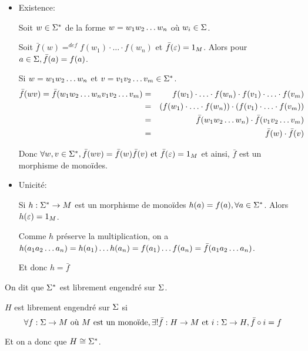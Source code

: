 \begin{proofI}
	\begin{itemize}
		\item Existence:

		      Soit $w\in \Sigma^{*}$ de la forme $w = w_1 w_2 \ldots w_{n}$ où $w_i \in \Sigma$.

		      Soit $\bar f (w) =^{def} f(w_1) \cdot \ldots \cdot f(w_n)$ et $\bar f (\varepsilon) = 1_M$. Alors pour $a\in \Sigma, \bar f (a) = f (a)$.

		      Si $w = w_1 w_2 \ldots w_{n}$ et $v = v_1 v_2 \ldots v_{m} \in \Sigma^{*}$.
		      \begin{eqnarray*}
			      \bar f(wv) = \bar f(w_1 w_2 \ldots w_{n} v_1 v_2 \ldots v_{m}) &=& f(w_1) \cdot \ldots \cdot f(w_n) \cdot f(v_1) \cdot \ldots \cdot f(v_m) \\
			      &=& \left( f(w_1) \cdot \ldots \cdot f(w_n)\right)\cdot\left(f(v_1) \cdot \ldots \cdot f(v_m) \right)\\
			      &=& \bar f(w_1 w_2 \ldots w_{n}) \cdot \bar f (v_1 v_2 \ldots v_{m}) \\
			      &=& \bar f(w) \cdot \bar f (v)
		      \end{eqnarray*}

		      Donc $\forall w, v \in \Sigma^{*}, \bar f (wv) = \bar f (w)\bar f(v) \text{ et } \bar f (\varepsilon) = 1_M$ et ainsi, $\bar f$ est un morphisme de monoïdes.


		\item Unicité:

		      Si $h : \Sigma^{*} \to M$ est un morphisme de monoïdes \tq $h(a) = f(a), \forall a \in \Sigma^{*}$. Alors $h(\varepsilon) = 1_M$.

		      Comme $h$ préserve la multiplication, on a
		      $h (a_1 a_2 \ldots a_{n}) = h(a_1) \ldots h(a_n) = f(a_1) \ldots f(a_n) = \bar f (a_1 a_2 \ldots a_{n})$.

		      Et donc $h = \bar f$
	\end{itemize}
\end{proofI}

On dit que $\Sigma^{*}$ est librement engendré sur $\Sigma$.

\begin{definition}
	$H$ est librement engendré sur $\Sigma$ si
	$$\forall f : \Sigma \to M \text{ où } M  \text { est un monoïde}, \exists ! \bar f : H \to M \text{ et } i : \Sigma \to H, \bar f \circ i   = f $$


	Et on a donc que $ H \cong \Sigma^{*}$.
\end{definition}

